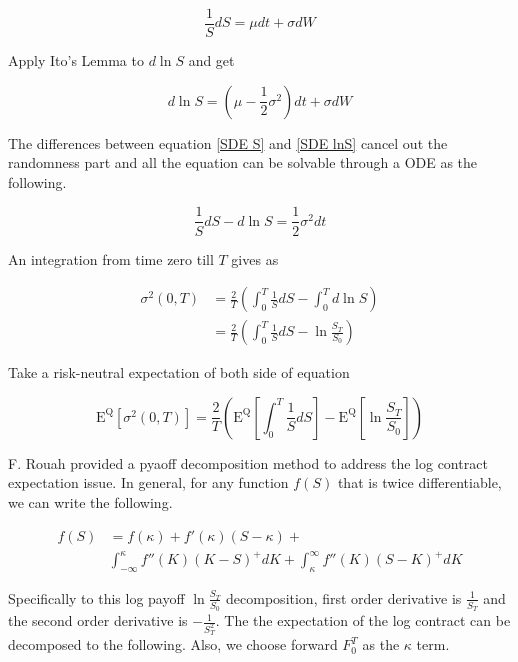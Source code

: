 \documentclass{article}
\begin{document}
\begin{equation} \label{SDE S}
    \frac{1}{S} dS = \mu dt + \sigma dW
\end{equation}

Apply Ito's Lemma to $ d\ln{S} $ and get

\begin{equation} \label{SDE lnS}
    d\ln{S} = \left(\mu - \frac{1}{2} \sigma^2 \right) dt + \sigma dW
\end{equation}

The differences between equation \ref{SDE S} and \ref{SDE lnS} cancel out the randomness part and all the equation can be solvable through a ODE as the following.

\begin{equation}
    \frac{1}{S} dS - d\ln{S} = \frac{1}{2} \sigma^2 dt
\end{equation}

An integration from time zero till $ T $ gives as

\begin{align}
    \sigma^2\left(0, T\right) &= \frac{2}{T} \left(\int_0^T{\frac{1}{S} dS} - \int_0^T{d\ln{S}}\right) \nonumber \\
    &= \frac{2}{T} \left(\int_0^T{\frac{1}{S} dS} - \ln{\frac{S_T}{S_0}}\right)
\end{align}

Take a risk-neutral expectation of both side of equation

\begin{equation} \label{Expectation of variance}
    \mathrm{E}^{\mathrm{Q}}{\left[\sigma^2(0, T)\right]} = \frac{2}{T} \left( \mathrm{E}^{\mathrm{Q}}{\left[\int_0^T{\frac{1}{S} dS}\right]} - \mathrm{E}^{\mathrm{Q}}{\left[\ln{\frac{S_T}{S_0}}\right]} \right)
\end{equation}

F. Rouah \cite{Payoff Function Decomposition} provided a pyaoff decomposition method to address the log contract expectation issue. In general, for any function $ f(S) $ that is twice differentiable, we can write the following.

\begin{align}
    f(S) &= f(\kappa) + f'(\kappa) (S - \kappa) + \nonumber \\
    & \int_{-\infty}^{\kappa}{f''(K)(K - S)^{+} dK} + \int_{\kappa}^{\infty}{f''(K)(S - K)^{+} dK}
\end{align}

Specifically to this log payoff $ \ln{\frac{S_T}{S_0}} $ decomposition, first order derivative is $ \frac{1}{S_T} $ and the second order derivative is $ -\frac{1}{S_T^2} $. The the expectation of the log contract can be decomposed to the following. Also, we choose forward $ F_0^T $ as the $ \kappa $ term.
\end{document}
